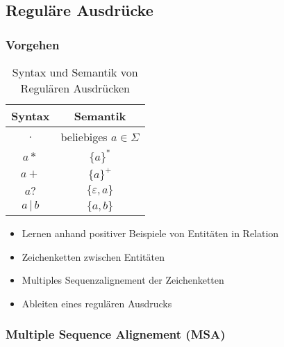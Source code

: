 \documentclass[nonacm=true, language=german]{acmart}
\newcommand{\set}[1]{\{#1\}}
\begin{document}
\subsection{Reguläre Ausdrücke}

\subsubsection{Vorgehen}

\begin{table}[ht]
    \centering
    \begin{tabular}{c c}
        \toprule
        Syntax  & Semantik \\
        \midrule
        $.$             & beliebiges $a \in \Sigma $ \\
        $a*$            & $\set{a}^*$ \\
        $a+$            & $\set{a}^+$ \\
        $a?$            & $\set{\varepsilon, a}$ \\
        $a \, | \, b$   & $\set{a, b}$ \\
        \bottomrule
    \end{tabular}
    \caption{Syntax und Semantik von Regulären Ausdrücken}
    \label{tab:my_label}
\end{table}

\begin{itemize}
    \item Lernen anhand positiver Beispiele von Entitäten in Relation
    \item Zeichenketten zwischen Entitäten
    \item Multiples Sequenzalignement der Zeichenketten
    \item Ableiten eines regulären Ausdrucks
\end{itemize}

\subsubsection{Multiple Sequence Alignement (MSA)}
\end{document}
